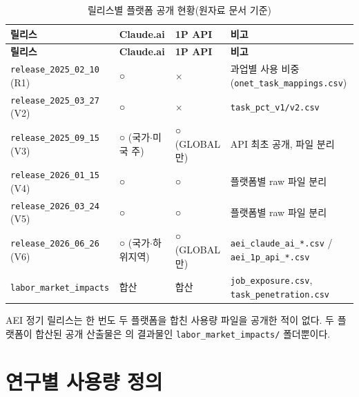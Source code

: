\documentclass[11pt]{article}
\begin{document}
\begin{longtable}{L{4.2cm}L{2.6cm}L{2.6cm}L{6.4cm}}
\caption{릴리스별 플랫폼 공개 현황(원자료 문서 기준)}\label{tab:release}\\
\toprule
\textbf{릴리스} & \textbf{Claude.ai} & \textbf{1P API} & \textbf{비고}\\
\midrule
\endfirsthead
\toprule
\textbf{릴리스} & \textbf{Claude.ai} & \textbf{1P API} & \textbf{비고}\\
\midrule
\endhead
\bottomrule
\endfoot
\texttt{release\_2025\_02\_10} (R1) & ○ & $\times$ & 과업별 사용 비중(\texttt{onet\_task\_mappings.csv})\\
\texttt{release\_2025\_03\_27} (V2) & ○ & $\times$ & \texttt{task\_pct\_v1/v2.csv}\\
\texttt{release\_2025\_09\_15} (V3) & ○ (국가$\cdot$미국 주) & ○ (GLOBAL만) & API 최초 공개, 파일 분리\\
\texttt{release\_2026\_01\_15} (V4) & ○ & ○ & 플랫폼별 raw 파일 분리\\
\texttt{release\_2026\_03\_24} (V5) & ○ & ○ & 플랫폼별 raw 파일 분리\\
\texttt{release\_2026\_06\_26} (V6) & ○ (국가$\cdot$하위지역) & ○ (GLOBAL만) & \texttt{aei\_claude\_ai\_*.csv} / \texttt{aei\_1p\_api\_*.csv}\\
\texttt{labor\_market\_impacts} & 합산 & 합산 & \texttt{job\_exposure.csv}, \texttt{task\_penetration.csv}\\
\end{longtable}

AEI 정기 릴리스는 한 번도 두 플랫폼을 합친 사용량 파일을 공개한 적이 없다. 두 플랫폼이 합산된 공개 산출물은 \textcite{massenkoff-2026-labor-market-impacts-of-ai}의 결과물인 \texttt{labor\_market\_impacts/} 폴더뿐이다.

\section{연구별 사용량 정의}
\label{sec:studies}
\end{document}
